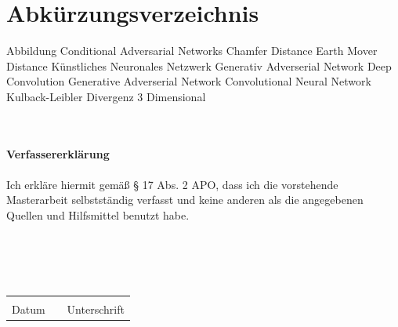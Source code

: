 \documentclass{llncs}
\begin{document}
\section*{Abkürzungsverzeichnis}
\begin{acronym}[Bash]
	 Abbildung
	 Conditional Adversarial Networks
	 Chamfer Distance
	 Earth Mover Distance
	 Künstliches Neuronales Netzwerk
	 Generativ Adverserial Network
	 Deep Convolution Generative Adverserial Network
	 Convolutional Neural Network
	 Kulback-Leibler Divergenz
	 3 Dimensional 
\end{acronym}
\newpage


~\\\\
\pagebreak\linebreak 
\textbf{\large{Verfassererklärung}}\\\\
Ich erkläre hiermit gemäß § 17 Abs. 2 APO, dass ich die vorstehende Masterarbeit
selbstständig verfasst und keine anderen als die angegebenen Quellen und
Hilfsmittel benutzt habe.\\\\\\\\\
\vspace{5.0cm}
\begin{tabular}{lp{2em}l}
	\hspace{3cm}   && \hspace{3cm} \\\cline{1-1}\cline{3-3}
	Datum     && Unterschrift
\end{tabular}
\end{document}
